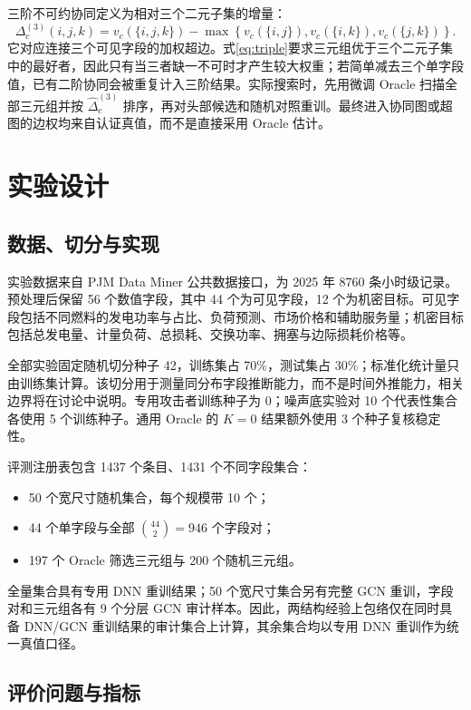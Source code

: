 \documentclass[UTF8,a4paper,zihao=5,fontset=fandol]{ctexart}
\begin{document}
三阶不可约协同定义为相对三个二元子集的增量：
\begin{equation}
  \Delta_c^{(3)}(i,j,k)
  =
  v_c(\{i,j,k\})-
  \max\left\{
  v_c(\{i,j\}),v_c(\{i,k\}),v_c(\{j,k\})
  \right\}.
  \label{eq:triple}
\end{equation}
它对应连接三个可见字段的加权超边\citep{berge1989hypergraphs}。式\eqref{eq:triple}要求三元组优于三个二元子集中的最好者，因此只有当三者缺一不可时才产生较大权重；若简单减去三个单字段值，已有二阶协同会被重复计入三阶结果。实际搜索时，先用微调 Oracle 扫描全部三元组并按 $\widehat\Delta_c^{(3)}$ 排序，再对头部候选和随机对照重训。最终进入协同图或超图的边权均来自认证真值，而不是直接采用 Oracle 估计。

\section{实验设计}

\subsection{数据、切分与实现}

实验数据来自 PJM Data Miner 公共数据接口\citep{pjmdataminer}，为 2025 年 8760 条小时级记录。预处理后保留 56 个数值字段，其中 44 个为可见字段，12 个为机密目标。可见字段包括不同燃料的发电功率与占比、负荷预测、市场价格和辅助服务量；机密目标包括总发电量、计量负荷、总损耗、交换功率、拥塞与边际损耗价格等。

全部实验固定随机切分种子 42，训练集占 70\%，测试集占 30\%；标准化统计量只由训练集计算。该切分用于测量同分布字段推断能力，而不是时间外推能力，相关边界将在讨论中说明。专用攻击者训练种子为 0；噪声底实验对 10 个代表性集合各使用 5 个训练种子。通用 Oracle 的 $K=0$ 结果额外使用 3 个种子复核稳定性。

评测注册表包含 1437 个条目、1431 个不同字段集合：
\begin{itemize}
  \item 50 个宽尺寸随机集合，每个规模带 10 个；
  \item 44 个单字段与全部 $\binom{44}{2}=946$ 个字段对；
  \item 197 个 Oracle 筛选三元组与 200 个随机三元组。
\end{itemize}
全量集合具有专用 DNN 重训结果；50 个宽尺寸集合另有完整 GCN 重训，字段对和三元组各有 9 个分层 GCN 审计样本。因此，两结构经验上包络仅在同时具备 DNN/GCN 重训结果的审计集合上计算，其余集合均以专用 DNN 重训作为统一真值口径。

\subsection{评价问题与指标}
\end{document}
